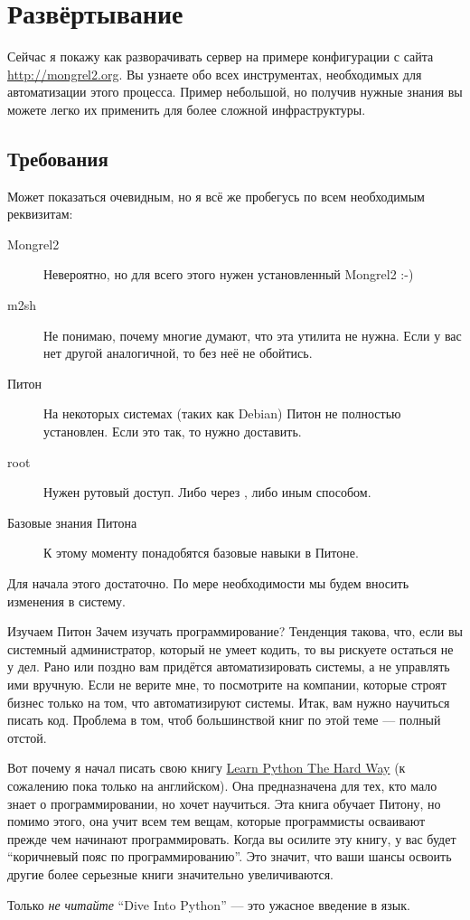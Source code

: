 \chapter{Развёртывание}

Сейчас я покажу как разворачивать сервер на примере конфигурации с сайта
\url{http://mongrel2.org}. Вы узнаете обо всех инструментах, необходимых для
автоматизации этого процесса. Пример небольшой, но получив нужные знания вы
можете легко их применить для более сложной инфраструктуры.

\section{Требования}

Может показаться очевидным, но я всё же пробегусь по всем необходимым
реквизитам:

\begin{description}
\item [Mongrel2] Невероятно, но для всего этого нужен установленный Mongrel2 :-)
\item [m2sh] Не понимаю, почему многие думают, что эта утилита не нужна. Если у
    вас нет другой аналогичной, то без неё не обойтись.
\item [Питон] На некоторых системах (таких как Debian) Питон не полностью
    установлен. Если это так, то нужно доставить.
\item [root] Нужен рутовый доступ. Либо через , либо иным способом.
\item [Базовые знания Питона] К этому моменту понадобятся базовые навыки в
Питоне.
\end{description}

Для начала этого достаточно. По мере необходимости мы будем вносить изменения в
систему.

\begin{aside}{Изучаем Питон}
Зачем изучать программирование? Тенденция такова, что, если вы системный
администратор, который не умеет кодить, то вы рискуете остаться не у дел. Рано
или поздно вам придётся автоматизировать системы, а не управлять ими вручную.
Если не верите мне, то посмотрите на компании, которые строят бизнес только на
том, что автоматизируют системы. Итак, вам нужно научиться писать код. Проблема
в том, чтоб большинствой книг по этой теме --- полный отстой.

Вот почему я начал писать свою книгу
\href{http://learnpythonthehardway.org}{Learn Python The Hard Way} (к сожалению
пока только на английском). Она предназначена для тех, кто мало знает о
программировании, но хочет научиться. Эта книга обучает Питону, но помимо этого,
она учит всем тем вещам, которые программисты осваивают прежде чем начинают
программировать. Когда вы осилите эту книгу, у вас будет ``коричневый пояс по
программированию''. Это значит, что ваши шансы освоить другие более серьезные
книги значительно увеличиваются.

Только \emph{не читайте} ``Dive Into Python'' --- это ужасное введение в язык.
\end{aside}

